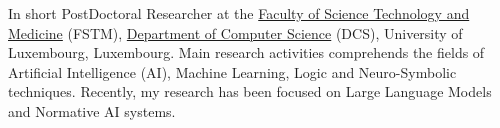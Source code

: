 \documentclass{resume} %
\begin{document}
    
    \begin{rSection}{In short}
        PostDoctoral Researcher at the \href{https://www.uni.lu/fstm-en/}{Faculty of Science Technology and Medicine} (FSTM), \href{https://www.uni.lu/fstm-en/research-departments/department-of-computer-science/}{Department of Computer Science} (DCS), University of Luxembourg, Luxembourg.
        Main research activities comprehends the fields of Artificial Intelligence (AI), Machine Learning, Logic and Neuro-Symbolic techniques.
        Recently, my research has been focused on Large Language Models and Normative AI systems.
    \end{rSection}
    
\end{document}
